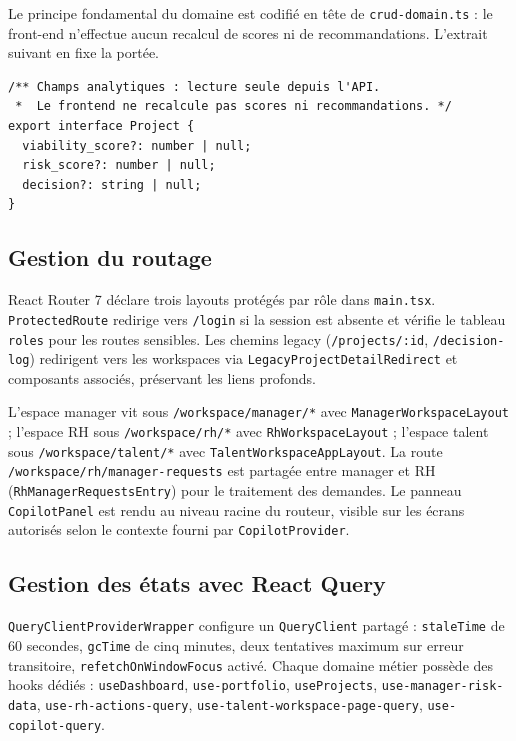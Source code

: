 Le principe fondamental du domaine est codifié en tête de \texttt{crud-domain.ts} : le front-end n'effectue aucun recalcul de scores ni de recommandations. L'extrait suivant en fixe la portée.

\begin{lstlisting}[caption={Principe pas de calcul front (\texttt{crud-domain.ts})},label={lst:crud-domain}]
/** Champs analytiques : lecture seule depuis l'API.
 *  Le frontend ne recalcule pas scores ni recommandations. */
export interface Project {
  viability_score?: number | null;
  risk_score?: number | null;
  decision?: string | null;
}
\end{lstlisting}

\subsection{Gestion du routage}

React Router 7 déclare trois layouts protégés par rôle dans \texttt{main.tsx}. \texttt{ProtectedRoute} redirige vers \texttt{/login} si la session est absente et vérifie le tableau \texttt{roles} pour les routes sensibles. Les chemins legacy (\texttt{/projects/:id}, \texttt{/decision-log}) redirigent vers les workspaces via \texttt{LegacyProjectDetailRedirect} et composants associés, préservant les liens profonds.

L'espace manager vit sous \texttt{/workspace/manager/*} avec \texttt{ManagerWorkspaceLayout} ; l'espace RH sous \texttt{/workspace/rh/*} avec \texttt{RhWorkspaceLayout} ; l'espace talent sous \texttt{/workspace/talent/*} avec \texttt{TalentWorkspaceAppLayout}. La route \texttt{/workspace/rh/manager-requests} est partagée entre manager et RH (\texttt{RhManagerRequestsEntry}) pour le traitement des demandes. Le panneau \texttt{CopilotPanel} est rendu au niveau racine du routeur, visible sur les écrans autorisés selon le contexte fourni par \texttt{CopilotProvider}.

\subsection{Gestion des états avec React Query}

\texttt{QueryClientProviderWrapper} configure un \texttt{QueryClient} partagé : \texttt{staleTime} de 60 secondes, \texttt{gcTime} de cinq minutes, deux tentatives maximum sur erreur transitoire, \texttt{refetchOnWindowFocus} activé. Chaque domaine métier possède des hooks dédiés : \texttt{useDashboard}, \texttt{use-portfolio}, \texttt{useProjects}, \texttt{use-manager-risk-data}, \texttt{use-rh-actions-query}, \texttt{use-talent-workspace-page-query}, \texttt{use-copilot-query}.


